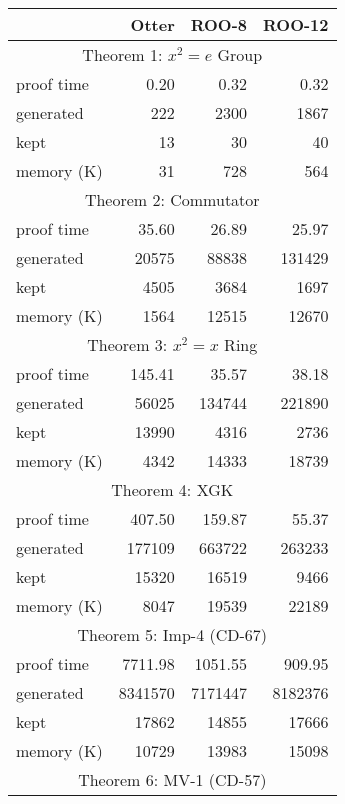 \begin{table}[htbp] \centering
\begin{tabular}{lrrr}
            &  Otter     &    ROO-8       &    ROO-12              \\
\hline
          \multicolumn{4}{c}{Theorem 1: $x^2=e$ Group} \\
proof time  & 0.20     & 0.32    & 0.32      \\
generated   & 222      & 2300    & 1867      \\
kept        & 13       & 30      & 40        \\
memory (K)  & 31       & 728     & 564       \\
\hline
          \multicolumn{4}{c}{Theorem 2: Commutator} \\
proof time  & 35.60    & 26.89   & 25.97     \\
generated   & 20575    & 88838   & 131429    \\
kept        & 4505     & 3684    & 1697      \\
memory (K)  & 1564     & 12515   & 12670     \\
\hline
          \multicolumn{4}{c}{Theorem 3: $x^2=x$ Ring} \\
proof time  & 145.41   & 35.57   & 38.18     \\
generated   & 56025    & 134744  & 221890    \\
kept        & 13990    & 4316    & 2736      \\
memory (K)  & 4342     & 14333   & 18739     \\
\hline
          \multicolumn{4}{c}{Theorem 4: XGK} \\
proof time  & 407.50   & 159.87  & 55.37     \\
generated   & 177109   & 663722  & 263233    \\
kept        & 15320    & 16519   & 9466      \\
memory (K)  & 8047     & 19539   & 22189     \\
\hline
          \multicolumn{4}{c}{Theorem 5: Imp-4 (CD-67)} \\
proof time  & 7711.98  & 1051.55 & 909.95    \\
generated   & 8341570  & 7171447 & 8182376   \\
kept        & 17862    & 14855   & 17666     \\
memory (K)  & 10729    & 13983   & 15098     \\
\hline
          \multicolumn{4}{c}{Theorem 6: MV-1 (CD-57)} \\

\end{tabular}
\end{table}
